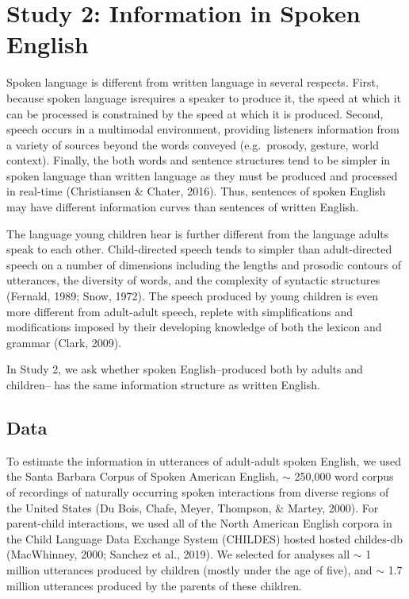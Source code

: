 \documentclass[10pt, letterpaper]{article}
\begin{document}
\hypertarget{study-2-information-in-spoken-english}{%
\section{Study 2: Information in Spoken
English}\label{study-2-information-in-spoken-english}}

Spoken language is different from written language in several respects.
First, because spoken language isrequires a speaker to produce it, the
speed at which it can be processed is constrained by the speed at which
it is produced. Second, speech occurs in a multimodal environment,
providing listeners information from a variety of sources beyond the
words conveyed (e.g.~prosody, gesture, world context). Finally, the both
words and sentence structures tend to be simpler in spoken language than
written language as they must be produced and processed in real-time
(Christiansen \& Chater, 2016). Thus, sentences of spoken English may
have different information curves than sentences of written English.

The language young children hear is further different from the language
adults speak to each other. Child-directed speech tends to simpler than
adult-directed speech on a number of dimensions including the lengths
and prosodic contours of utterances, the diversity of words, and the
complexity of syntactic structures (Fernald, 1989; Snow, 1972). The
speech produced by young children is even more different from
adult-adult speech, replete with simplifications and modifications
imposed by their developing knowledge of both the lexicon and grammar
(Clark, 2009).

In Study 2, we ask whether spoken English--produced both by adults and
children-- has the same information structure as written English.

\hypertarget{data-1}{%
\subsection{Data}\label{data-1}}

To estimate the information in utterances of adult-adult spoken English,
we used the Santa Barbara Corpus of Spoken American English, \(\sim\)
250,000 word corpus of recordings of naturally occurring spoken
interactions from diverse regions of the United States (Du Bois, Chafe,
Meyer, Thompson, \& Martey, 2000). For parent-child interactions, we
used all of the North American English corpora in the Child Language
Data Exchange System (CHILDES) hosted hosted childes-db (MacWhinney,
2000; Sanchez et al., 2019). We selected for analyses all \(\sim\) 1
million utterances produced by children (mostly under the age of five),
and \(\sim\) 1.7 million utterances produced by the parents of these
children.
\end{document}

